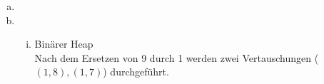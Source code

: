 \documentclass[a4paper]{scrartcl}
\begin{document}
\begin{enumerate}[(a)]
    \item

    \item 
        \begin{enumerate}[(i)]
            \item Binärer Heap \\
                Nach dem Ersetzen von 9 durch 1 werden zwei Vertauschungen
                ($(1,8), (1,7)$) durchgeführt. 


\end{enumerate}
\end{enumerate}
\end{document}
